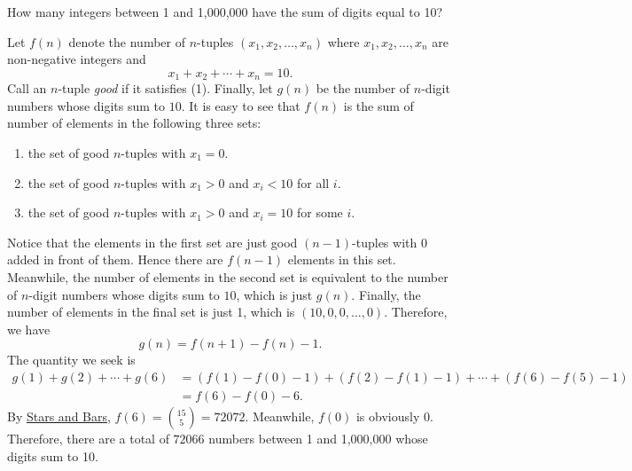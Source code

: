 \begin{question}
    How many integers between 1 and 1,000,000 have the sum of digits equal to 10?
\end{question}
\begin{solution}
    Let $f(n)$ denote the number of $n$-tuples $(x_1, x_2, \ldots, x_n)$ where
    $x_1, x_2, \ldots, x_n$ are non-negative integers and
    \setcounter{equation}{0}
    \begin{equation}
        x_1 + x_2 + \cdots + x_n = 10. 
    \end{equation}
    Call an $n$-tuple \emph{good} if it satisfies (1). Finally, let $g(n)$ be
    the number of $n$-digit numbers whose digits sum to $10$. It is easy to see
    that $f(n)$ is the sum of number of elements in the following three sets:
    \begin{enumerate}
        \item the set of good $n$-tuples with $x_1 = 0$.
        \item the set of good $n$-tuples with $x_1 > 0$ and $x_i < 10$ for all $i$.
        \item the set of good $n$-tuples with $x_1 > 0$ and $x_i = 10$ for some $i$.
    \end{enumerate}
    Notice that the elements in the first set are just good $(n - 1)$-tuples
    with 0 added in front of them. Hence there are $f(n - 1)$ elements in this
    set. Meanwhile, the number of elements in the second set is equivalent to
    the number of $n$-digit numbers whose digits sum to $10$, which is just
    $g(n)$. Finally, the number of elements in the final set is just 1, which
    is $(10, 0, 0, \ldots, 0)$. Therefore, we have
    \[ g(n) = f(n + 1) - f(n) - 1. \]
    The quantity we seek is 
    \begin{align*}
        g(1) + g(2) + \cdots + g(6) &= (f(1) - f(0) - 1) + (f(2) - f(1) - 1) + \cdots + (f(6) - f(5) - 1)\\
        &= f(6) - f(0) - 6.
    \end{align*}
    By \hyperref[teq: starsandbars]{Stars and Bars}, $f(6) = \binom{15}{5} =
    72072$. Meanwhile, $f(0)$ is obviously 0. Therefore,
    there are a total of $72066$ numbers between 1 and 1,000,000 whose digits
    sum to 10.
\end{solution}

